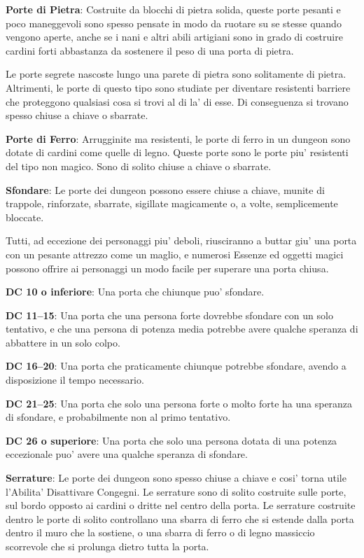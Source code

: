 \documentclass[a4paper,11pt,twoside,openany]{dndbook}
\begin{document}
{\textbf{Porte di Pietra}: Costruite da blocchi di pietra solida, queste porte pesanti e poco maneggevoli sono spesso pensate in modo da ruotare su se stesse quando vengono aperte, anche se i nani e altri abili artigiani sono in grado di costruire cardini forti abbastanza da sostenere il peso di una porta di pietra.

Le porte segrete nascoste lungo una parete di pietra sono solitamente di pietra. Altrimenti, le porte di questo tipo sono studiate per diventare resistenti barriere che proteggono qualsiasi cosa si trovi al di la' di esse. Di conseguenza si trovano spesso chiuse a chiave o sbarrate.

\textbf{Porte di Ferro}: Arrugginite ma resistenti, le porte di ferro in un dungeon sono dotate di cardini come quelle di legno. Queste porte sono le porte piu' resistenti del tipo non magico. Sono di solito chiuse a chiave o sbarrate.

\textbf{Sfondare}: Le porte dei dungeon possono essere chiuse a chiave, munite di trappole, rinforzate, sbarrate, sigillate magicamente o, a volte, semplicemente bloccate.

Tutti, ad eccezione dei personaggi piu' deboli, riusciranno a buttar giu' una porta con un pesante attrezzo come un maglio, e numerosi Essenze ed oggetti magici possono offrire ai personaggi un modo facile per superare una porta chiusa.

\textbf{DC 10 o inferiore}: Una porta che chiunque puo' sfondare.

\textbf{DC 11--15}: Una porta che una persona forte dovrebbe sfondare con un solo tentativo, e che una persona di potenza media potrebbe avere qualche speranza di abbattere in un solo colpo.

\textbf{DC 16--20}: Una porta che praticamente chiunque potrebbe sfondare, avendo a disposizione il tempo necessario. 

\textbf{DC 21--25}: Una porta che solo una persona forte o molto forte ha una speranza di sfondare, e probabilmente non al primo tentativo. 

\textbf{DC 26 o superiore}: Una porta che solo una persona dotata di una potenza eccezionale puo' avere una qualche speranza di sfondare.

\textbf{Serrature}: Le porte dei dungeon sono spesso chiuse a chiave e cosi' torna utile l'Abilita' Disattivare Congegni. Le serrature sono di solito costruite sulle porte, sul bordo opposto ai cardini o dritte nel centro della porta. Le serrature costruite dentro le porte di solito controllano una sbarra di ferro che si estende dalla porta dentro il muro che la sostiene, o una sbarra di ferro o di legno massiccio scorrevole che si prolunga dietro tutta la porta. 

}
\end{document}
